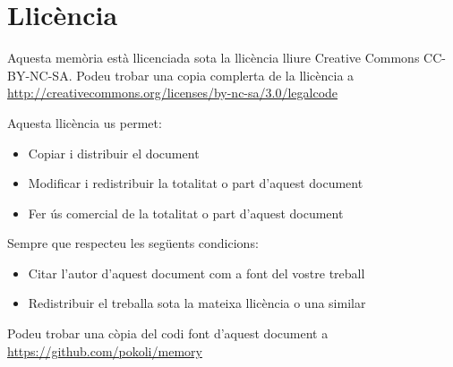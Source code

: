 \chapter*{Llicència}

Aquesta memòria està llicenciada sota la llicència lliure Creative Commons CC-BY-NC-SA. Podeu trobar una copia complerta de la llicència a \url{http://creativecommons.org/licenses/by-nc-sa/3.0/legalcode}

Aquesta llicència us permet: 

\begin{itemize}
    \item{Copiar i distribuir el document}
    \item{Modificar i redistribuir la totalitat o part d'aquest document}
    \item{Fer ús comercial de la totalitat o part d'aquest document} 
\end{itemize}

Sempre que respecteu les següents condicions: 

\begin{itemize}
    \item{Citar l'autor d'aquest document com a font del vostre treball}
    \item{Redistribuir el treballa sota la mateixa llicència o una similar}
\end{itemize}

Podeu trobar una còpia del codi font d'aquest document a \url{https://github.com/pokoli/memory}

